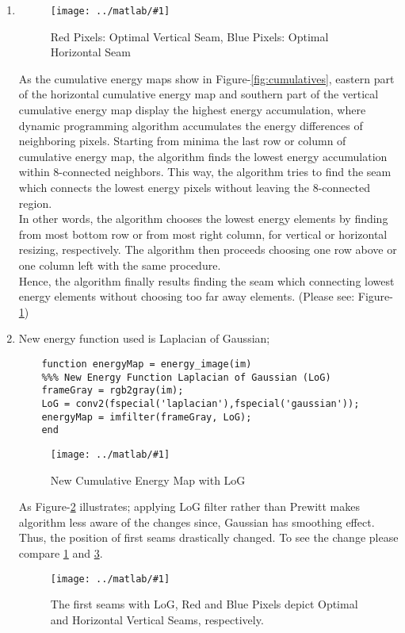 \documentclass{article}
\newcommand{\listFigure}[3]{ \begin{figure}[H]
\texttt{[image: ../matlab/\#1]}
		\caption{#2\label{fig:#3}}
	\end{figure}		
}
\begin{document}
\begin{enumerate}
	\item
	\listFigure{seams.png}{Red Pixels: Optimal Vertical Seam, Blue
	Pixels: Optimal Horizontal Seam}{seams}
	As the cumulative energy maps show in Figure-\ref{fig:cumulatives}, eastern
	part of the horizontal cumulative energy map and southern part of the vertical
	cumulative energy map display the highest energy accumulation, where dynamic
	programming algorithm accumulates the energy differences of neighboring pixels.
	Starting from minima the last row or column of cumulative energy map, the
	algorithm finds the lowest energy accumulation within 8-connected neighbors.
	This way, the algorithm tries to find the seam which connects the lowest energy pixels without leaving the
	8-connected region. \\
	In other words, the algorithm chooses the lowest energy
	elements by finding from most bottom row or from most right column, for
	vertical or horizontal resizing, respectively. The algorithm then proceeds
	choosing one row above or one column left with the same procedure. \\
	Hence, the algorithm finally results finding the seam which connecting lowest
	energy elements without choosing too far away elements.
	(Please see: Figure-\ref{fig:seams})
	\item
	New energy function used is Laplacian of Gaussian;
	\begin{lstlisting}
	function energyMap = energy_image(im)
	%%% New Energy Function Laplacian of Gaussian (LoG)
	frameGray = rgb2gray(im);  
	LoG = conv2(fspecial('laplacian'),fspecial('gaussian'));
	energyMap = imfilter(frameGray, LoG); 
	end		
	\end{lstlisting}	
	\listFigure{cumulatives-2.png}{New Cumulative Energy Map with
	LoG}{cumulatives2}
	As Figure-\ref{fig:cumulatives2} illustrates; applying LoG filter rather than
	Prewitt makes algorithm less aware of the changes since, Gaussian has smoothing
	effect. Thus, the position of first seams drastically changed. To see the
	change please compare \ref{fig:seams} and \ref{fig:seams2}.
    \listFigure{seams-2.png}{The first seams with LoG, Red and Blue Pixels
    depict Optimal and Horizontal Vertical Seams, respectively.}{seams2}
    

\end{enumerate}
\end{document}
